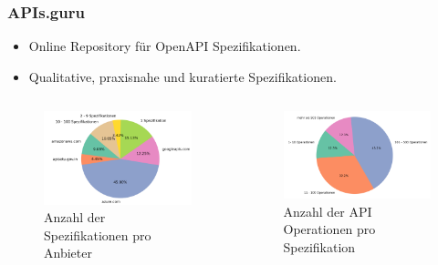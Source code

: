 \begin{frame}
  \frametitle{APIs.guru}
  \begin{itemize}
    \item Online Repository für OpenAPI Spezifikationen.
    \item Qualitative, praxisnahe und kuratierte Spezifikationen.
  \end{itemize}
  \hspace{1cm}
  \begin{columns}
    \begin{column}{0.5 \textwidth}
      \begin{figure}[htbp]
        \centering
        \includegraphics[width=1\textwidth]{img/defense-specificationsperdomainpie.png}
        \caption{Anzahl der Spezifikationen pro Anbieter}
        \label{fig:Specifications}
      \end{figure}    
    \end{column}
    \begin{column}{0.5 \textwidth}
      \begin{figure}[htbp]
        \centering
        \includegraphics[width=1\textwidth]{img/defense-operationsperspecificationpie.png}
        \caption{Anzahl der API Operationen pro Spezifikation}
        \label{fig:Operations}
      \end{figure}    
    \end{column}
  \end{columns}
\end{frame}

